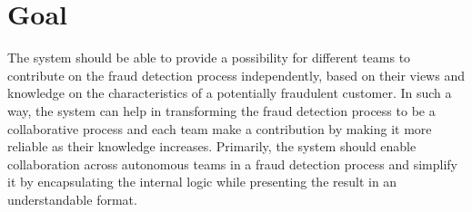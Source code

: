 \section{Goal}

 The system should be able to provide a possibility for different teams to contribute on the fraud detection process independently, based on their views and knowledge on the characteristics of a potentially fraudulent customer. In such a way, the system can help in transforming the fraud detection process to be a collaborative process and each team make a contribution by making it more reliable as their knowledge increases. Primarily, the system should enable collaboration across autonomous teams in a fraud detection process and simplify it by encapsulating the internal logic while presenting the result in an understandable format. 